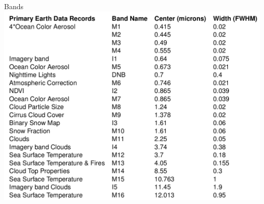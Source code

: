 \documentclass[aspectratio=169]{beamer} %
\begin{document}
      \begin{frame}{Bands}
        \includegraphics[width = .7\linewidth]{table.png}

\end{frame}
\end{document}
